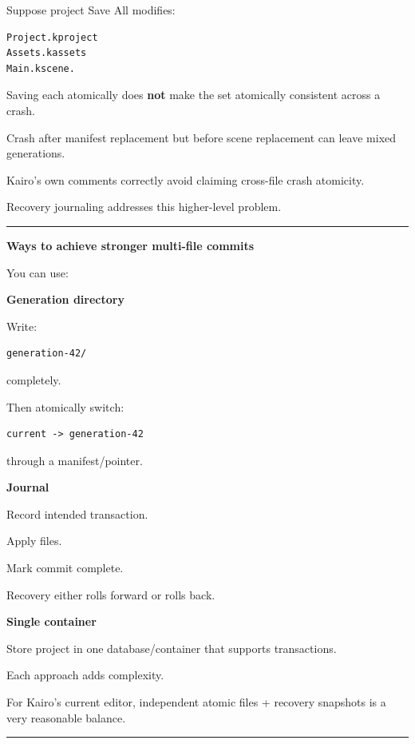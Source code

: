 Suppose project Save All modifies:

\begin{verbatim}
Project.kproject
Assets.kassets
Main.kscene.
\end{verbatim}

Saving each atomically does \textbf{not} make the set atomically consistent across a crash.

Crash after manifest replacement but before scene replacement can leave mixed generations.

Kairo's own comments correctly avoid claiming cross-file crash atomicity.

Recovery journaling addresses this higher-level problem.

\begin{center}\rule{0.5\linewidth}{0.5pt}\end{center}

\textbf{Ways to achieve stronger multi-file commits}

You can use:

\textbf{Generation directory}

Write:

\begin{verbatim}
generation-42/
\end{verbatim}

completely.

Then atomically switch:

\begin{verbatim}
current -> generation-42
\end{verbatim}

through a manifest/pointer.

\textbf{Journal}

Record intended transaction.

Apply files.

Mark commit complete.

Recovery either rolls forward or rolls back.

\textbf{Single container}

Store project in one database/container that supports transactions.

Each approach adds complexity.

For Kairo's current editor, independent atomic files + recovery snapshots is a very reasonable balance.

\begin{center}\rule{0.5\linewidth}{0.5pt}\end{center}

